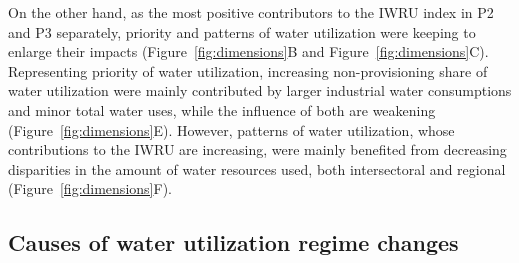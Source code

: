 \documentclass[9pt, twocolumn, twoside, lineno]{pnas-new}
\begin{document}
On the other hand, as the most positive contributors to the IWRU index in P2 and P3 separately, priority and patterns of water utilization were keeping to enlarge their impacts (Figure~\ref{fig:dimensions}B and Figure~\ref{fig:dimensions}C). 
Representing priority of water utilization, increasing non-provisioning share of water utilization were mainly contributed by larger industrial water consumptions and minor total water uses, while the influence of both are weakening (Figure~\ref{fig:dimensions}E).
However, patterns of water utilization, whose contributions to the IWRU are increasing, were mainly benefited from decreasing disparities in the amount of water resources used, both intersectoral and regional (Figure~\ref{fig:dimensions}F).


\subsection*{Causes of water utilization regime changes}
\end{document}
